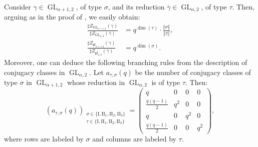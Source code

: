 \documentclass[11pt,english]{article}
\numberwithin{equation}{section}
\numberwithin{figure}{section}
\theoremstyle{definition}
\theoremstyle{plain}
\theoremstyle{remark}
\DeclareMathOperator{\GL}{GL}
\begin{document}
Consider $\gamma\in\GL_{\alpha+1,2}$, of type $\sigma$, and its
reduction $\overline{\gamma}\in\GL_{\alpha,2}$, of type $\tau$.
Then, arguing as in the proof of \cite[Prop. 2.5.]{AKOV16}, we easily
obtain:\begin{align*}
\frac{\sharp Z_{\GL_{\alpha+1,2}}(\gamma)}{\sharp Z_{\GL_{\alpha,2}}(\overline{\gamma})}
&=
q^{\dim(\tau)}\cdot\frac{\Vert\sigma\Vert}{\Vert\tau\Vert}, \\
\frac{\sharp Z_{\mathfrak{gl}_{\alpha+1,2}}(\gamma)}{\sharp Z_{\mathfrak{gl}_{\alpha,2}}(\overline{\gamma})}
&=
q^{\dim(\sigma)}.
\end{align*} Moreover, one can deduce the following branching rules from the description
of conjugacy classes in $\GL_{\alpha,2}$. Let $a_{\tau,\sigma}(q)$
be the number of conjugacy classes of type $\sigma$ in $\GL_{\alpha+1,2}$
whose reduction in $\GL_{\alpha,2}$ is of type $\tau$. Then:\[
\left(a_{\tau,\sigma}(q)\right)_{\substack{\sigma\in\{\mathrm{I},\mathrm{II}_{1},\mathrm{II}_{2},\mathrm{II}_{3}\} \\ \tau\in\{\mathrm{I},\mathrm{II}_{1},\mathrm{II}_{2},\mathrm{II}_{3}\}}}
=
\left(
\begin{array}{cccc}
q & 0 & 0 & 0 \\
\frac{q(q-1)}{2} & q^2 & 0 & 0 \\
q & 0 & q^2 & 0 \\
\frac{q(q-1)}{2} & 0 & 0 & q^2
\end{array}
\right)
,
\] where rows are labeled by $\sigma$ and columns are labeled by $\tau$.
\end{document}
